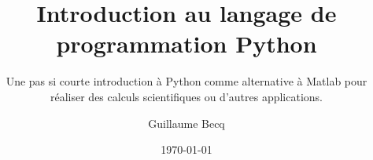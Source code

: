 \documentclass[]{beamer}
\author[G. Becq]{Guillaume Becq}
\title[Introduction à Python]{Introduction au langage de programmation Python}
\subtitle{{\footnotesize Une pas si courte introduction à Python comme alternative à Matlab pour réaliser des calculs scientifiques ou d'autres applications.}}
\date{\today}
\begin{document}
\begin{frame}[plain]
\maketitle
\end{frame}
\framePlan





\frame{}
\appendix

\end{document}
